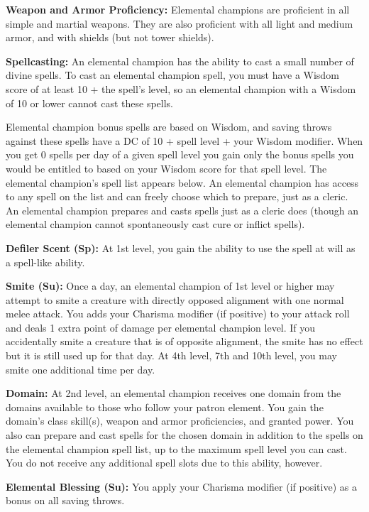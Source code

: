 {
\textbf{Weapon and Armor Proficiency:} Elemental champions are proficient in all simple and martial weapons. They are also proficient with all light and medium armor, and with shields (but not tower shields).

\textbf{Spellcasting:} An elemental champion has the ability to cast a small number of divine spells. To cast an elemental champion spell, you must have a Wisdom score of at least 10 + the spell's level, so an elemental champion with a Wisdom of 10 or lower cannot cast these spells.

Elemental champion bonus spells are based on Wisdom, and saving throws against these spells have a DC of 10 + spell level + your Wisdom modifier. When you get 0 spells per day of a given spell level you gain only the bonus spells you would be entitled to based on your Wisdom score for that spell level. The elemental champion's spell list appears below. An elemental champion has access to any spell on the list and can freely choose which to prepare, just as a cleric. An elemental champion prepares and casts spells just as a cleric does (though an elemental champion cannot spontaneously cast cure or inflict spells).

\textbf{Defiler Scent (Sp):} At 1st level, you gain the ability to use the  spell at will as a spell-like ability.

\textbf{Smite (Su):} Once a day, an elemental champion of 1st level or higher may attempt to smite a creature with directly opposed alignment with one normal melee attack. You adds your Charisma modifier (if positive) to your attack roll and deals 1 extra point of damage per elemental champion level. If you accidentally smite a creature that is of opposite alignment, the smite has no effect but it is still used up for that day. At 4th level, 7th and 10th level, you may smite one additional time per day.

\textbf{Domain:} At 2nd level, an elemental champion receives one domain from the domains available to those who follow your patron element. You gain the domain's class skill(s), weapon and armor proficiencies, and granted power. You also can prepare and cast spells for the chosen domain in addition to the spells on the elemental champion spell list, up to the maximum spell level you can cast. You do not receive any additional spell slots due to this ability, however.

\textbf{Elemental Blessing (Su):} You apply your Charisma modifier (if positive) as a bonus on all saving throws.

}
